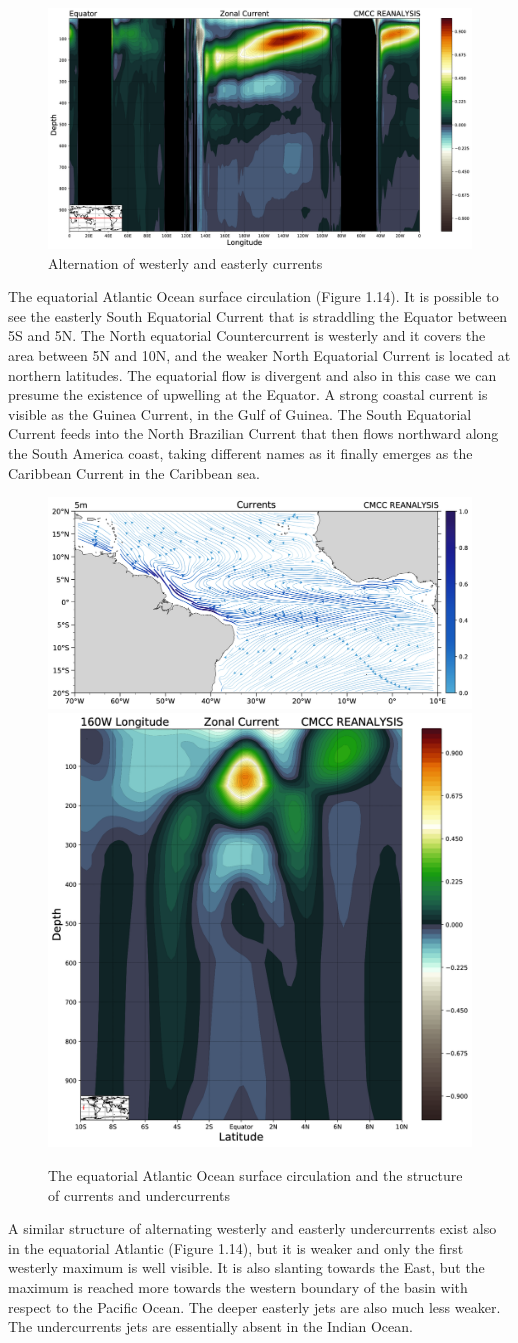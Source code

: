 \begin{figure}[htpb]
	\centering
	\includegraphics[width = 0.4 \textwidth]{uploads/40image.png}
	\caption{Alternation of westerly and easterly currents} \label{fig:fig16}
\end{figure}

The equatorial Atlantic Ocean surface circulation (Figure 1.14). It is possible to see the easterly South Equatorial
Current that is straddling the Equator between 5S and 5N. The North
equatorial Countercurrent is westerly and it covers the area between 5N
and 10N, and the weaker North Equatorial Current is located at northern
latitudes. The equatorial flow is divergent and also in this case we can
presume the existence of upwelling at the Equator. A strong coastal
current is visible as the Guinea Current, in the Gulf of Guinea. The
South Equatorial Current feeds into the North Brazilian Current that
then flows northward along the South America coast, taking different
names as it finally emerges as the Caribbean Current in the Caribbean
sea.
\begin{figure}[htpb!]
	\centering
	\includegraphics[width=0.45\linewidth]{uploads/41image.png}\quad \includegraphics[width=0.3\linewidth]{uploads/42.png}
	\caption{The equatorial Atlantic Ocean surface circulation and the structure of currents and undercurrents}
	\label{fig:fig17}
\end{figure}
A similar structure of alternating westerly and easterly undercurrents
exist also in the equatorial Atlantic (Figure 1.14), but it
is weaker and only the first westerly maximum is well visible. It is
also slanting towards the East, but the maximum is reached more towards
the western boundary of the basin with respect to the Pacific Ocean. The
deeper easterly jets are also much less weaker. The undercurrents jets
are essentially absent in the Indian Ocean.


